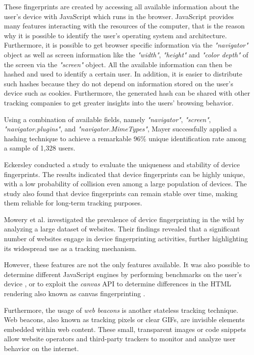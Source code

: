 These fingerprints are created by accessing all available information about the user's device with JavaScript which runs in the browser.
JavaScript provides many features interacting with the resources of the computer, that is the reason why it is possible to identify the user's 
operating system and architecture. Furthermore, it is possible to get browser specific information via the \emph{"navigator"} object as well as 
screen information like the \emph{"width"}, \emph{"height"} and \emph{"color depth"} of the screen via the \emph{"screen"} object. All the available 
information can then be hashed and used to identify a certain user. In addition, it is easier to distribute such hashes because they do not depend 
on information stored on the user's device such as cookies. Furthermore, the generated hash can be shared with other tracking companies to get greater
insights into the users' browsing behavior.

Using a combination of available fields, namely \emph{"navigator"}, \emph{"screen"}, \emph{"navigator.plugins"}, and \emph{"navigator.MimeTypes"},
Mayer \cite{mayer2009any} successfully applied a hashing technique to achieve a remarkable 96\% unique identification rate among
a sample of 1,328 users.

Eckersley \cite{eckersley2010unique} conducted a study to evaluate the uniqueness and stability of
device fingerprints. The results indicated that device fingerprints can be highly unique,
with a low probability of collision even among a large population of devices. The study also found
that device fingerprints can remain stable over time, making them reliable for long-term tracking purposes.

Mowery et al. \cite{mowery2011fingerprinting} investigated the prevalence of device fingerprinting
in the wild by analyzing a large dataset of websites. Their findings revealed that a significant
number of websites engage in device fingerprinting activities, further highlighting its widespread
use as a tracking mechanism.

However, these features are not the only features available. It was also possible to determine different JavaScript engines by 
performing benchmarks on the user's device \cite{miyazaki2008online}, or to exploit the \emph{canvas} API to determine differences 
in the HTML rendering also known as canvas fingerprinting \cite{mowery2012pixel}.

Furthermore, the usage of \emph{web beacons} is another stateless tracking technique.
Web beacons, also known as tracking pixels or clear GIFs, are invisible elements embedded within web content.
These small, transparent images or code snippets allow website operators and third-party trackers to monitor
and analyze user behavior on the internet.

